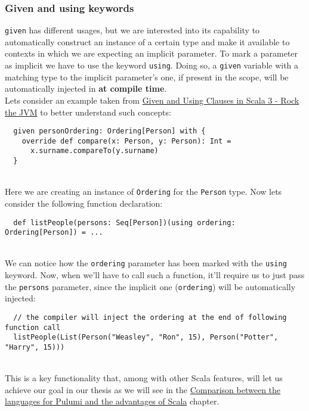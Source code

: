 \subsubsection{Given and using keywords}
\label{par:given-using}
\texttt{given} has different usages, but we are interested into its capability to automatically construct an instance of a certain type and make it available to contexts in which we are expecting an implicit parameter.
To mark a parameter as implicit we have to use the keyword \texttt{using}.
Doing so, a \texttt{given} variable with a matching type to the implicit parameter's one, if present in the scope, will be automatically injected in \textbf{at compile time}.\\
Lets consider an example taken from \href{https://blog.rockthejvm.com/scala-3-given-using/}{Given and Using Clauses in Scala 3 - Rock the JVM} to better understand such concepts:
\begin{verbatim}
  given personOrdering: Ordering[Person] with {
    override def compare(x: Person, y: Person): Int = 
      x.surname.compareTo(y.surname)
  }
\end{verbatim}\mbox{}\\
Here we are creating an instance of \texttt{Ordering} for the \texttt{Person} type.
Now lets consider the following function declaration:
\begin{verbatim}
  def listPeople(persons: Seq[Person])(using ordering: Ordering[Person]) = ...
\end{verbatim}\mbox{}\\
We can notice how the \texttt{ordering} parameter has been marked with the \texttt{using} keyword.
Now, when we'll have to call such a function, it'll require us to just pass the \texttt{persons} parameter, since the implicit one (\texttt{ordering}) will be automatically injected:
\begin{verbatim}
  // the compiler will inject the ordering at the end of following function call
  listPeople(List(Person("Weasley", "Ron", 15), Person("Potter", "Harry", 15)))
\end{verbatim}\mbox{}\\
This is a key functionality that, among with other Scala features, will let us achieve our goal in our thesis as we will see in the \hyperref[cap:comparisons]{Comparison between the languages for Pulumi and the advantages of Scala} chapter.


